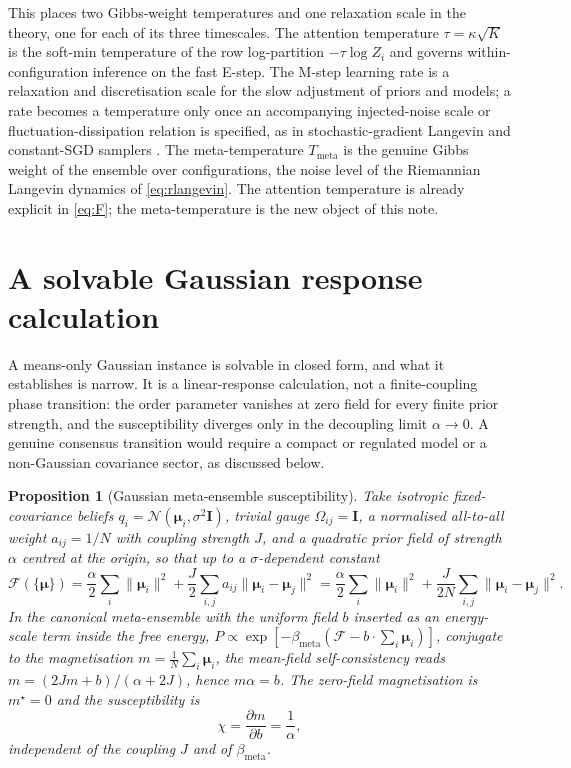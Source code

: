 \documentclass[11pt]{article}
\theoremstyle{plain}
\newtheorem{proposition}{Proposition}[section]
\theoremstyle{definition}
\newcommand{\bmu}{\boldsymbol{\mu}}
\newcommand{\bI}{\mathbf{I}}
\newcommand{\Fcal}{\mathcal{F}}
\newcommand{\Ncal}{\mathcal{N}}
\newcommand{\Tmeta}{T_{\mathrm{meta}}}
\newcommand{\bmeta}{\beta_{\mathrm{meta}}}
\newcommand{\Omegaij}{\Omega_{ij}}
\begin{document}
This places two Gibbs-weight temperatures and one relaxation scale in the theory, one for
each of its three timescales. The attention temperature $\tau=\kappa\sqrt{K}$ is the
soft-min temperature of the row log-partition $-\tau\log Z_i$ and governs within-configuration
inference on the fast E-step. The M-step learning rate is a relaxation and discretisation scale
for the slow adjustment of priors and models; a rate becomes a temperature only once an
accompanying injected-noise scale or fluctuation-dissipation relation is specified, as in
stochastic-gradient Langevin and constant-SGD samplers \citep{welling2011bayesian,mandt2017stochastic}.
The meta-temperature $\Tmeta$ is the genuine Gibbs weight of the ensemble over configurations,
the noise level of the Riemannian Langevin dynamics of \cref{eq:rlangevin}. The attention
temperature is already explicit in \cref{eq:F}; the meta-temperature is the new object of this
note.

\section{A solvable Gaussian response calculation}
\label{sec:phase}

A means-only Gaussian instance is solvable in closed form, and what it establishes is
narrow. It is a linear-response calculation, not a finite-coupling phase transition: the
order parameter vanishes at zero field for every finite prior strength, and the
susceptibility diverges only in the decoupling limit $\alpha\to0$. A genuine consensus
transition would require a compact or regulated model or a non-Gaussian covariance
sector, as discussed below.

\begin{proposition}[Gaussian meta-ensemble susceptibility]
\label{prop:gaussian}
Take isotropic fixed-covariance beliefs $q_i=\Ncal(\bmu_i,\sigma^2\bI)$, trivial gauge
$\Omegaij=\bI$, a normalised all-to-all weight $a_{ij}=1/N$ with coupling strength $J$,
and a quadratic prior field of strength $\alpha$ centred at the origin, so that up to a
$\sigma$-dependent constant
\begin{equation}
\label{eq:gaussianF}
\Fcal(\{\bmu\})=\frac{\alpha}{2}\sum_i\|\bmu_i\|^2
+\frac{J}{2}\sum_{i,j}a_{ij}\|\bmu_i-\bmu_j\|^2
=\frac{\alpha}{2}\sum_i\|\bmu_i\|^2+\frac{J}{2N}\sum_{i,j}\|\bmu_i-\bmu_j\|^2 .
\end{equation}
In the canonical meta-ensemble with the uniform field $b$ inserted as an energy-scale term inside the
free energy, $P\propto\exp[-\bmeta(\Fcal-b\cdot\sum_i\bmu_i)]$, conjugate to the magnetisation
$m=\frac1N\sum_i\bmu_i$, the mean-field
self-consistency reads $m=(2Jm+b)/(\alpha+2J)$, hence $m\alpha=b$. The zero-field
magnetisation is $m^{\star}=0$ and the susceptibility is
\begin{equation}
\chi=\frac{\partial m}{\partial b}=\frac{1}{\alpha},
\end{equation}
independent of the coupling $J$ and of $\bmeta$.
\end{proposition}
\end{document}

